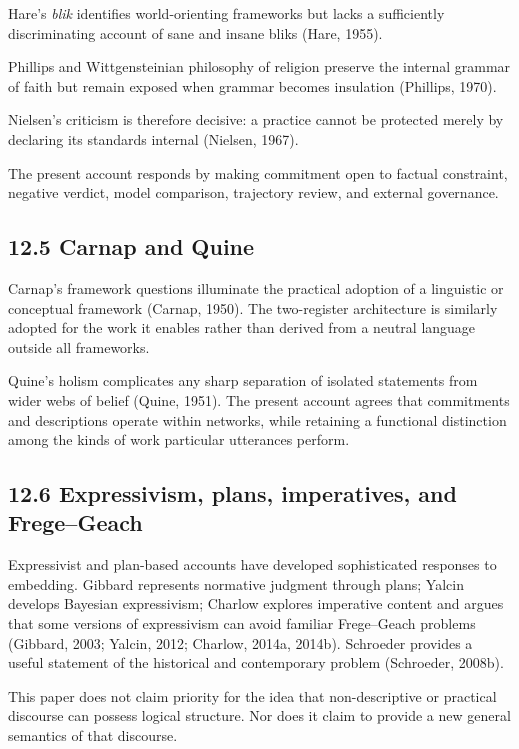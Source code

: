 \documentclass[
  11pt,
]{article}
\begin{document}
Hare's \emph{blik} identifies world-orienting frameworks but lacks a
sufficiently discriminating account of sane and insane bliks (Hare,
1955).

Phillips and Wittgensteinian philosophy of religion preserve the
internal grammar of faith but remain exposed when grammar becomes
insulation (Phillips, 1970).

Nielsen's criticism is therefore decisive: a practice cannot be
protected merely by declaring its standards internal (Nielsen, 1967).

The present account responds by making commitment open to factual
constraint, negative verdict, model comparison, trajectory review, and
external governance.

\subsection{12.5 Carnap and Quine}\label{carnap-and-quine}

Carnap's framework questions illuminate the practical adoption of a
linguistic or conceptual framework (Carnap, 1950). The two-register
architecture is similarly adopted for the work it enables rather than
derived from a neutral language outside all frameworks.

Quine's holism complicates any sharp separation of isolated statements
from wider webs of belief (Quine, 1951). The present account agrees that
commitments and descriptions operate within networks, while retaining a
functional distinction among the kinds of work particular utterances
perform.

\subsection{12.6 Expressivism, plans, imperatives, and
Frege--Geach}\label{expressivism-plans-imperatives-and-fregegeach}

Expressivist and plan-based accounts have developed sophisticated
responses to embedding. Gibbard represents normative judgment through
plans; Yalcin develops Bayesian expressivism; Charlow explores
imperative content and argues that some versions of expressivism can
avoid familiar Frege--Geach problems (Gibbard, 2003; Yalcin, 2012;
Charlow, 2014a, 2014b). Schroeder provides a useful statement of the
historical and contemporary problem (Schroeder, 2008b).

This paper does not claim priority for the idea that non-descriptive or
practical discourse can possess logical structure. Nor does it claim to
provide a new general semantics of that discourse.
\end{document}
